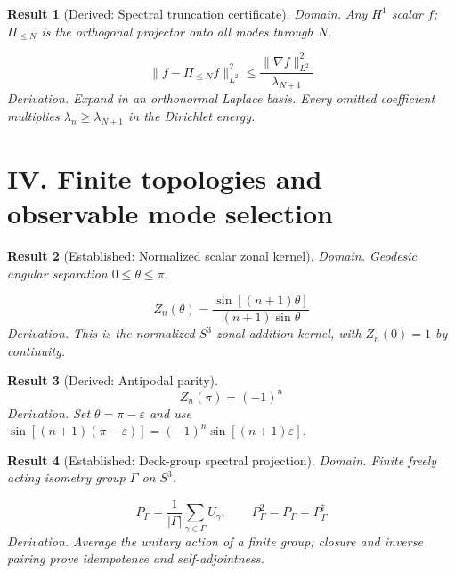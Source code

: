 \documentclass[aps,prd,onecolumn,notitlepage,groupedaddress,11pt]{revtex4-2}
\newtheorem{result}{Result}
\begin{document}
\begin{result}[\textsf{Derived}: Spectral truncation certificate]\label{res:18}
\textit{Domain.} Any $H^1$ scalar $f$; $\Pi_{\le N}$ is the orthogonal projector onto all modes through $N$.\par
\begin{equation}\label{eq:18}
\|f-\Pi_{\le N}f\|_{L^2}^2\le\frac{\|\nabla f\|_{L^2}^2}{\lambda_{N+1}}
\end{equation}
\textit{Derivation.} Expand in an orthonormal Laplace basis. Every omitted coefficient multiplies $\lambda_n\ge\lambda_{N+1}$ in the Dirichlet energy.
\end{result}

\section{IV. Finite topologies and observable mode selection}

\begin{result}[\textsf{Established}: Normalized scalar zonal kernel]\label{res:19}
\textit{Domain.} Geodesic angular separation $0\le\theta\le\pi$.\par
\begin{equation}\label{eq:19}
Z_n(\theta)=\frac{\sin[(n+1)\theta]}{(n+1)\sin\theta}
\end{equation}
\textit{Derivation.} This is the normalized $S^3$ zonal addition kernel, with $Z_n(0)=1$ by continuity.
\end{result}

\begin{result}[\textsf{Derived}: Antipodal parity]\label{res:20}
\begin{equation}\label{eq:20}
Z_n(\pi)=(-1)^n
\end{equation}
\textit{Derivation.} Set $\theta=\pi-\varepsilon$ and use $\sin[(n+1)(\pi-\varepsilon)]=(-1)^n\sin[(n+1)\varepsilon]$.
\end{result}

\begin{result}[\textsf{Established}: Deck-group spectral projection]\label{res:21}
\textit{Domain.} Finite freely acting isometry group $\Gamma$ on $S^3$.\par
\begin{equation}\label{eq:21}
P_{\Gamma}=\frac1{|\Gamma|}\sum_{\gamma\in\Gamma}U_{\gamma},\qquad P_{\Gamma}^2=P_{\Gamma}=P_{\Gamma}^{\dagger}
\end{equation}
\textit{Derivation.} Average the unitary action of a finite group; closure and inverse pairing prove idempotence and self-adjointness.
\end{result}
\end{document}
